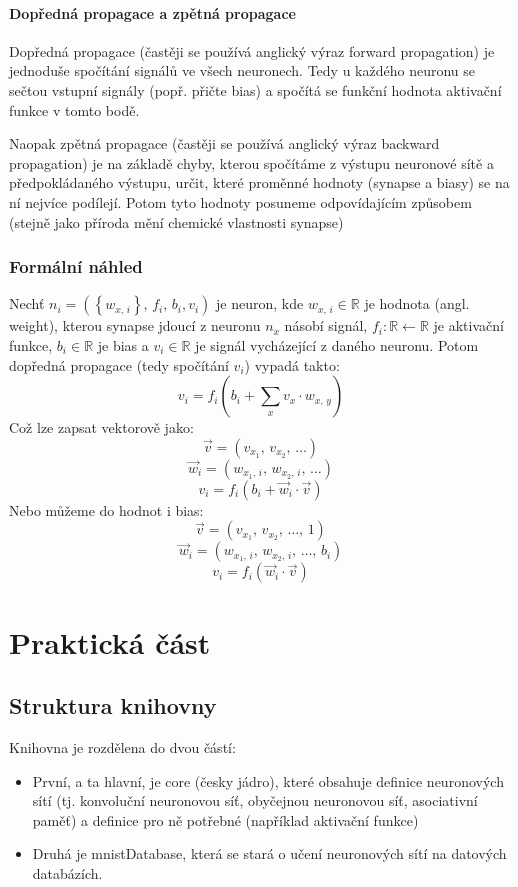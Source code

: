 \documentclass[12pt]{report}			%
\newcommand{\R}{\mathbb{R}}   			%
\begin{document}
				\subsection{Dopředná propagace a zpětná propagace}
					Dopředná propagace (častěji se používá anglický výraz forward propagation) je jednoduše spočítání signálů ve všech neuronech. Tedy u každého neuronu se sečtou vstupní signály (popř. přičte bias) a spočítá se funkční hodnota aktivační funkce v tomto bodě.
					
					Naopak zpětná propagace (častěji se používá anglický výraz backward propagation) je na základě chyby, kterou spočítáme z výstupu neuronové sítě a předpokládaného výstupu, určit, které proměnné hodnoty (\gls{synapse} a biasy) se na ní nejvíce podílejí. Potom tyto hodnoty posuneme odpovídajícím způsobem (stejně jako příroda mění chemické vlastnosti \gls{synapse})
			
			
			\section{Formální náhled}
				Nechť $n_i = (\left\{w_{x,\,i}\right\},\,f_i,\,b_i,v_i)$ je neuron, kde $w_{x,\,i} \in \R$ je hodnota (angl. weight), kterou \gls{synapse} jdoucí z neuronu $n_x$ násobí signál, $f_i: \R \leftarrow \R$ je aktivační funkce, $b_i \in \R$ je bias a $v_i \in \R$ je signál vycházející z daného neuronu. Potom dopředná propagace (tedy spočítání $v_i$) vypadá takto:
				$$ v_i = f_i\left(b_i + \sum_x v_x \cdot w_{x,\,y} \right) $$
				Což lze zapsat vektorově jako:
				$$ \vec{v} = (v_{x_1},\,v_{x_2},\,\ldots) $$
				$$ \vec{w}_i = (w_{x_1,\,i},\,w_{x_2,\,i},\,\ldots) $$
				$$ v_i = f_i\left(b_i + \vec{w}_i \cdot \vec{v} \right) $$
				Nebo můžeme do hodnot  i bias:
				$$ \vec{v} = (v_{x_1},\,v_{x_2},\,\ldots,\,1) $$
				$$ \vec{w}_i = (w_{x_1,\,i},\,w_{x_2,\,i},\,\ldots,\,b_i) $$
				$$ v_i = f_i\left(\vec{w}_i \cdot \vec{v} \right) $$
				
			
		
	\part{Praktická část}
	
		\chapter{Struktura knihovny}
			Knihovna je rozdělena do dvou částí:
			\begin{itemize}
				\item První, a ta hlavní, je core (česky jádro), které obsahuje definice neuronových sítí (tj. konvoluční neuronovou síť, obyčejnou neuronovou síť, asociativní paměť) a definice pro ně potřebné (například aktivační funkce)
				\item Druhá je mnistDatabase, která se stará o učení neuronových sítí na datových databázích.
			\end{itemize}
			
\end{document}
